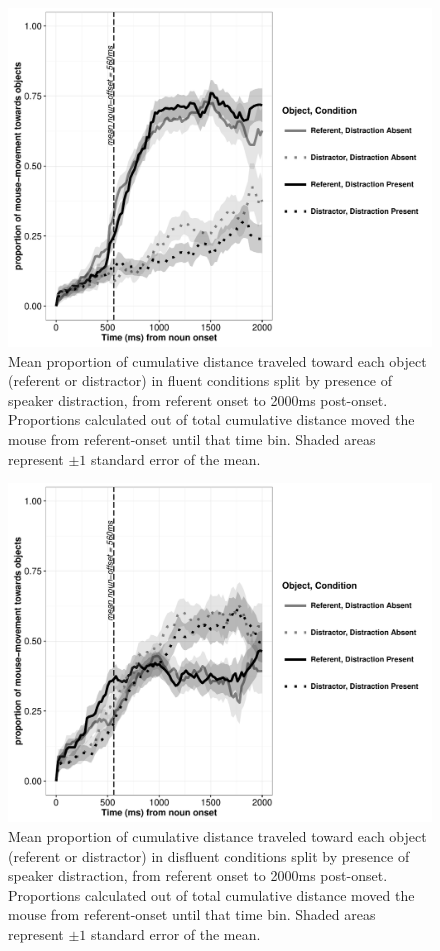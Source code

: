 \documentclass[a4paper,man,natbib]{apa6}
\begin{document}
\begin{figure}[Ht]
  \centering
	\includegraphics[width=\linewidth]{v2_mousefl.pdf}
  \caption{Mean proportion of cumulative distance traveled toward each object (referent or distractor) in fluent conditions split by presence of speaker distraction, from referent onset to 2000ms post-onset. Proportions calculated out of total cumulative distance moved the mouse from referent-onset until that time bin. Shaded areas represent $\pm 1$ standard error of the mean.}
  \label{fig:mflu}
\end{figure}


\begin{figure}[Ht]
  \centering
	\includegraphics[width=\linewidth]{v2_mousedisf.pdf}
  \caption{Mean proportion of cumulative distance traveled toward each object (referent or distractor) in disfluent conditions split by presence of speaker distraction, from referent onset to 2000ms post-onset. Proportions calculated out of total cumulative distance moved the mouse from referent-onset until that time bin. Shaded areas represent $\pm 1$ standard error of the mean.}
  \label{fig:mdis}
\end{figure}
\end{document}
